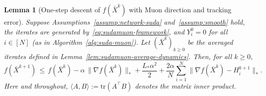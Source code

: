 \documentclass{article}
\newtheorem{lemma}{Lemma}
\begin{document}
\begin{lemma}[One-step descent of $f(\bar X^k)$ with Muon direction and tracking error]
\label{lem:sudamuon-one-step-descent}
Suppose Assumptions~\ref{assump:network-suda} and~\ref{assump:smooth} hold, the iterates are generated by~\eqref{eq:sudamuon-framework}, and $Y_i^0=0$ for all $i\in[N]$ (as in Algorithm~\ref{alg:suda-muon}).
Let $(\bar X^k)_{k\ge 0}$ be the averaged iterates defined in Lemma~\ref{lem:sudamuon-average-dynamics}.
Then, for all $k\ge 0$,
\begin{equation}
\label{eq:one-step-descent}
 f(\bar X^{k+1}) \,\le\, f(\bar X^k)
 - \alpha\,\|\nabla f(\bar X^k)\|_* + \frac{L_*\alpha^2}{2}
 + \frac{2\alpha}{N}\sum_{i=1}^N \|\nabla f(\bar X^k) - H_i^{k+1}\|_*.
\end{equation}
Here and throughout, $\langle A,B\rangle\!:=\!\mathrm{tr}(A^{\top}B)$ denotes the matrix inner product.
\end{lemma}
\end{document}
